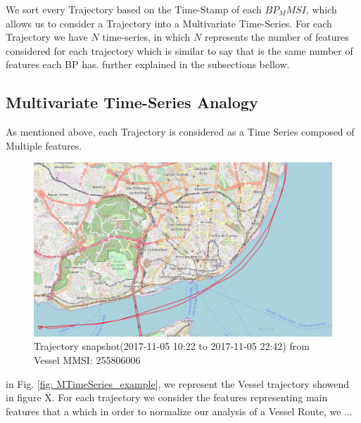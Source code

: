 We sort every Trajectory based on the Time-Stamp of each $BP_MMSI$, which allows us to consider a Trajectory into a Multivariate Time-Series. For each Trajectory we have $N$ time-series, in which $N$ represents the number of features considered for each trajectory which is similar to say that is the same number of features each BP has. further explained in the subsections bellow.





\subsection{Multivariate Time-Series Analogy}
As mentioned above, each Trajectory is considered as a Time Series composed of Multiple features.  


\begin{figure}[H]
	\centering
	\includegraphics[scale = .3]{figures/Ch3/traj_example.png}
    \caption{Trajectory snapshot(2017-11-05 10:22 to 2017-11-05 22:42) from Vessel MMSI: 255806006}
    \label{fig: TrajectorySMM_example}
\end{figure}


in Fig. \ref{fig: MTimeSeries_example}, we represent the Vessel trajectory showend in figure X. 
For each trajectory we consider the features representing 
main features that a which in order to normalize our analysis of a Vessel Route, we ...

